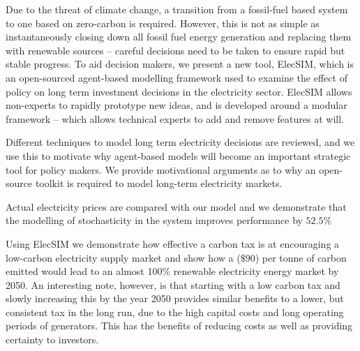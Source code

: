 Due to the threat of climate change, a transition from a fossil-fuel based system to one based on zero-carbon is required. However, this is not as simple as instantaneously closing down all fossil fuel energy generation and replacing them with renewable sources -- careful decisions need to be taken to ensure rapid but stable progress. To aid decision makers, we present a new tool, ElecSIM, which is an open-sourced agent-based modelling framework used to examine the effect of policy on long term investment decisions in the electricity sector. ElecSIM allows non-experts to rapidly prototype new ideas, and is developed around a modular framework -- which allows technical experts to add and remove features at will. 



Different techniques to model long term electricity decisions are reviewed, and we use this to motivate why agent-based models will become an important strategic tool for policy makers. We provide motivational arguments as to why an open-source toolkit is required to model long-term electricity markets.

Actual electricity prices are compared with our model and we demonstrate that the modelling of stochasticity in the system improves performance by $52.5\%$

Using ElecSIM we demonstrate how effective a carbon tax is at encouraging a low-carbon electricity supply market and show how a  ($\$90$) per tonne of carbon emitted would lead to an almost 100\% renewable electricity energy market by 2050. An interesting note, however, is that starting with a low carbon tax and slowly increasing this by the year 2050 provides similar benefits to a lower, but consistent tax in the long run, due to the high capital costs and long operating periods of generators. This has the benefits of reducing costs as well as providing certainty to investors.
